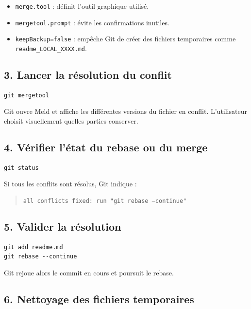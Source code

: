 \documentclass[11pt,a4paper]{article}
\begin{document}
\begin{itemize}
	\item \texttt{merge.tool} : définit l’outil graphique utilisé.
	\item \texttt{mergetool.prompt} : évite les confirmations inutiles.
	\item \texttt{keepBackup=false} : empêche Git de créer des fichiers temporaires
	comme \texttt{readme\_LOCAL\_XXXX.md}.
\end{itemize}

\subsection*{3. Lancer la résolution du conflit}

\begin{lstlisting}[style=bashstyle]
git mergetool
\end{lstlisting}

Git ouvre Meld et affiche les différentes versions du fichier en conflit.
L’utilisateur choisit visuellement quelles parties conserver.

\subsection*{4. Vérifier l’état du rebase ou du merge}

\begin{lstlisting}[style=bashstyle]
git status
\end{lstlisting}

Si tous les conflits sont résolus, Git indique :

\begin{quote}
	\texttt{all conflicts fixed: run "git rebase --continue"}
\end{quote}

\subsection*{5. Valider la résolution}

\begin{lstlisting}[style=bashstyle]
git add readme.md
git rebase --continue
\end{lstlisting}

Git rejoue alors le commit en cours et poursuit le rebase.

\subsection*{6. Nettoyage des fichiers temporaires}
\end{document}
